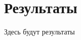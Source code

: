 \renewcommand{\chaptertitle}{Результаты}  %
\chapter{\chaptertitle}\label{ch:ch9}


Здесь будут результаты